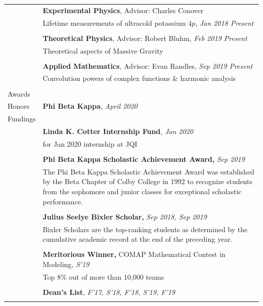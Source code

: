 \documentclass[10pt]{article}
\begin{document}
\begin{longtable}{ l m{13.5cm}   }
	& \textbf{Experimental Physics}, Advisor: Charles Conover \\
	& Lifetime measurements of ultracold potassium $4p$, \textit{Jan 2018 \textendash Present}\\
	& \\
	
	& \textbf{Theoretical Physics}, Advisor: Robert Bluhm, \textit{Feb 2019 \textendash Present}\\
	& Theoretical aspects of Massive Gravity\\
	& \\
	
	& \textbf{Applied Mathematics}, Advisor: Evan Randles, \textit{Sep 2019 \textendash Present}\\
	& Convolution powers of complex functions \& harmonic analysis\\
	& \\
     					
     					



\large{Awards}    	& \\
\large{Honors}		& \textbf{Phi Beta Kappa}, \textit{April 2020} \\
\large{Fundings}	& \\
& \textbf{Linda K. Cotter Internship Fund}, \textit{Jan 2020}\\
& for Jan 2020 internship at JQI\\
&\\
& \textbf{Phi Beta Kappa Scholastic Achievement Award,} \textit{Sep 2019}\\
& The Phi Beta Kappa Scholastic Achievement Award was established by the Beta Chapter of Colby College in 1992 to recognize students from the sophomore and junior classes for exceptional scholastic performance.\\
&\\
& \textbf{Julius Seelye Bixler Scholar,} \textit{Sep 2018, Sep 2019}\\
& Bixler Scholars are the top-ranking students as determined by the cumulative academic record at the end of the preceding year.\\
&\\
& \textbf{Meritorious Winner,}  COMAP Mathematical Contest in Modeling, \textit{S'19}\\
& Top 8\% out of more than 10,000 teams\\
&\\
& \textbf{Dean’s List}, \textit{F'17, S'18, F'18, S'19, F'19}\\
&\\
		

\end{longtable}
\end{document}
